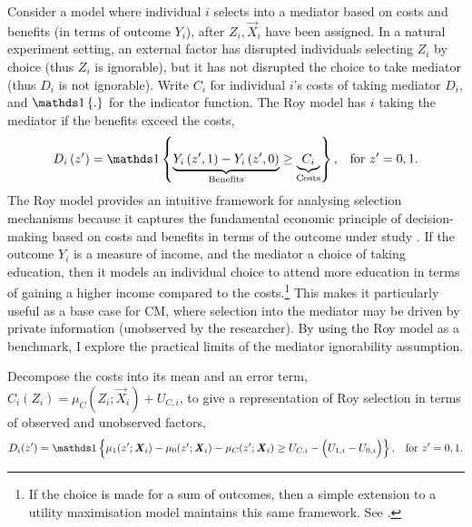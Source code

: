 Consider a model where individual $i$ selects into a mediator based on costs and benefits (in terms of outcome $Y_i$), after $Z_i, \vec X_i$ have been assigned.
In a natural experiment setting, an external factor has disrupted individuals selecting $Z_i$ by choice (thus $Z_i$ is ignorable), but it has not disrupted the choice to take mediator (thus $D_i$ is not ignorable).
Write $C_i$ for individual $i$'s costs of taking mediator $D_i$, and $\indicator{.}$ for the indicator function.
The Roy model has $i$ taking the mediator if the benefits exceed the costs,
\begin{equation}
    \label{eqn:roy-model}
    D_i \left( z' \right) = \indicator{
    \underbrace{Y_i\left( z', 1 \right) - Y_i\left( z', 0 \right)}_{\text{Benefits}}
    \geq \underbrace{C_i}_{\text{Costs}}}, \;\;\; \text{for } z'=0,1.
\end{equation}
The Roy model provides an intuitive framework for analysing selection mechanisms because it captures the fundamental economic principle of decision-making based on costs and benefits in terms of the outcome under study \citep{roy1951some,heckman1990empirical}.
If the outcome $Y_i$ is a measure of income, and the mediator a choice of taking education, then it models an individual choice to attend more education in terms of gaining a higher income compared to the costs.\footnote{
    If the choice is made for a sum of outcomes, then a simple extension to a utility maximisation model maintains this same framework.
    See \cite{heckman1990empirical}.
}
This makes it particularly useful as a base case for CM, where selection into the mediator may be driven by private information (unobserved by the researcher).
By using the Roy model as a benchmark, I explore the practical limits of the mediator ignorability assumption.

Decompose the costs into its mean and an error term, $C_i(Z_i) = \mu_{C}(Z_i; \vec X_i) + U_{C,i}$, to give a representation of Roy selection in terms of observed and unobserved factors,
\[ D_i(z') = \indicator{
    \mu_1(z'; \vec X_i) - \mu_0(z'; \vec X_i) - \mu_C(z'; \vec X_i)
    \geq U_{C,i} - \Big(U_{1,i} - U_{0,i}\Big) }
        , \;\;\; \text{for } z'=0,1. \]

